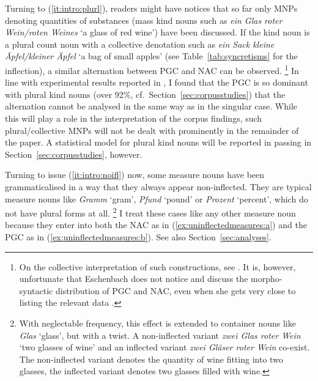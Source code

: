 \documentclass[USenglish]{article}
\begin{document}
Turning to (\ref{it:intro:plurl}), readers might have notices that so far only MNPs denoting quantities of substances (mass kind nouns such as \textit{ein Glas roter Wein\slash roten Weines} `a glass of red wine') have been discussed.
If the kind noun is a plural count noun with a collective denotation such as \textit{ein Sack kleine Äpfel\slash kleiner Äpfel} `a bag of small apples' (see Table~\ref{tab:syncretisms} for the inflection), a similar alternation between PGC and NAC can be observed.%
\footnote{\label{fn:eschenbash}On the collective interpretation of such constructions, see \cite{Eschenbach1994}.
It is, however, unfortunate that Eschenbach does not notice and discuss the morpho-syntactic distribution of PGC and NAC, even when she gets very close to listing the relevant data \citep[217]{Eschenbach1994}.}
In line with experimental results reported in \citet[15--16]{Zimmer2015}, I found that the PGC is so dominant with plural kind nouns (over 92\%, cf.\ Section~\ref{sec:corpusstudies}) that the alternation cannot be analysed in the same way as in the singular case.
While this will play a role in the interpretation of the corpus findings, such plural\slash collective MNPs will not be dealt with prominently in the remainder of the paper.
A statistical model for plural kind nouns will be reported in passing in Section~\ref{sec:corpusstudies}, however.

Turning to issue (\ref{it:intro:noifl}) now, some measure nouns have been grammaticalised in a way that they always appear non-inflected.
They are typical measure nouns like \textit{Gramm} `gram', \textit{Pfund} `pound' or \textit{Prozent} `percent', which do not have plural forms at all.%
\footnote{With neglectable frequency, this effect is extended to container nouns like \textit{Glas} `glass', but with a twist.
A non-inflected variant \textit{zwei Glas roter Wein} `two glasses of wine' and an inflected variant \textit{zwei Gläser roter Wein} co-exist.
The non-inflected variant denotes the quantity of wine fitting into two glasses, the inflected variant denotes two glasses filled with wine.}
I treat these cases like any other measure noun because they enter into both the NAC as in (\ref{ex:uninflectedmeasures:a}) and the PGC as in (\ref{ex:uninflectedmeasures:b}).
See also Section~\ref{sec:analyses}.

\begin{exe}
  \ex\label{ex:uninflectedmeasures}
  \begin{xlist}
  \end{xlist}
\end{exe}
\end{document}
